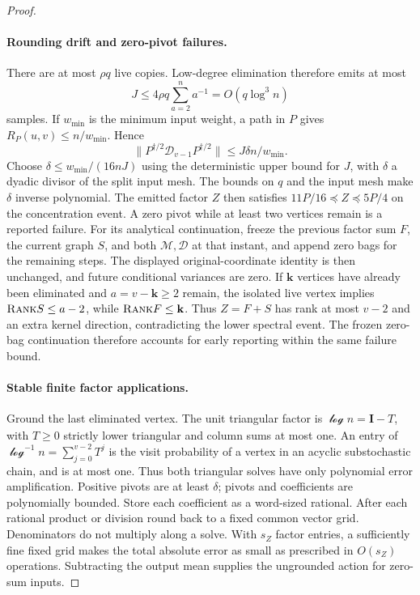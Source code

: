 \documentclass[11pt]{article}
\theoremstyle{remark}
\newcommand{\II}{\mathbf I}
\newcommand{\kk}{\mathbf k}
\newcommand{\norm}[1]{\lVert#1\rVert}
\newcommand{\rank}{\textsc{Rank}}
\begin{document}
\begin{proof}
\paragraph{Rounding drift and zero-pivot failures.}
There are at most $\rho q$ live copies.
Low-degree elimination therefore emits at most
\[
 J\le4\rho q\sum_{a=2}^n a^{-1}
       =O(q\log^3n)
\]
samples.
If $w_{\min}$ is the minimum input weight, a path in $P$ gives $R_P(u,v)\le
n/w_{\min}$.
Hence
\[
 \norm{P^{\dagger/2}\mathcal D_{v-1}P^{\dagger/2}}
                       \le J\delta n/w_{\min}.
\]
Choose $\delta\le w_{\min}/(16nJ)$ using the deterministic upper bound for $J$,
with $\delta$ a dyadic divisor of the split input mesh.
The bounds on $q$ and the input mesh make $\delta$ inverse polynomial.
The emitted factor $Z$ then satisfies $11P/16\preceq Z\preceq5P/4$ on the
concentration event.
A zero pivot while at least two vertices remain is a reported failure.
For its analytical continuation, freeze the previous factor sum $F$, the current
graph $S$, and both $\mathcal M,\mathcal D$ at that instant, and append zero
bags for the remaining steps.
The displayed original-coordinate identity is then unchanged, and future
conditional variances are zero.
If $\kk$ vertices have already been eliminated and $a=v-\kk\ge2$ remain, the
isolated live vertex implies $\rank S\le a-2$, while $\rank F\le \kk$.
Thus $Z=F+S$ has rank at most $v-2$ and an extra kernel direction, contradicting
the lower spectral event.
The frozen zero-bag continuation therefore accounts for early reporting within
the same failure bound.

\paragraph{Stable finite factor applications.}
Ground the last eliminated vertex.
The unit triangular factor is $\mathcal \log n=\II-T$, with $T\ge0$ strictly lower
triangular and column sums at most one.
An entry of $\mathcal \log^{-1} n=\sum_{j=0}^{v-2}T^j$ is the visit probability of a
vertex in an acyclic substochastic chain, and is at most one.
Thus both triangular solves have only polynomial error amplification.
Positive pivots are at least $\delta$; pivots and coefficients are polynomially
bounded.
Store each coefficient as a word-sized rational.
After each rational product or division round back to a fixed common vector
grid.
Denominators do not multiply along a solve.
With $s_Z$ factor entries, a sufficiently fine fixed grid makes the total
absolute error as small as prescribed in $O(s_Z)$ operations.
Subtracting the output mean supplies the ungrounded action for zero-sum inputs.


\end{proof}
\end{document}
